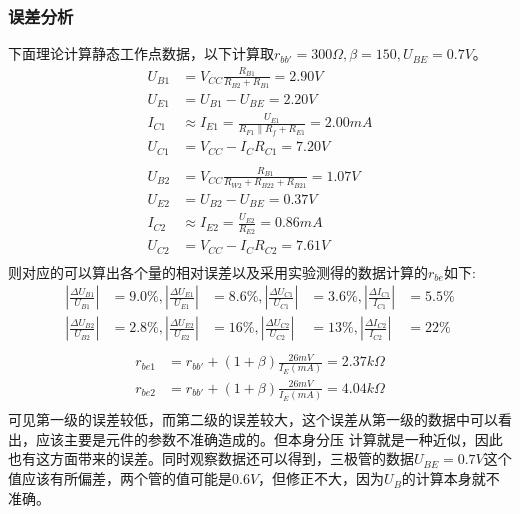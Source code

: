 \documentclass[a4paper,11pt,UTF8]{ctexart}
\begin{document}
  \subsubsection{误差分析}
  下面理论计算静态工作点数据，以下计算取$r_{bb'}=300\Omega,\beta=150,U_{BE}=0.7V$。
  \begin{equation}
    \begin{aligned}
      U_{B1}&=V_{CC}\frac{R_{B1}}{R_{B2}+R_{B1}}=2.90V\\
      U_{E1}&=U_{B1}-U_{BE}=2.20V\\
      I_{C1}&\approx I_{E1}=\frac{U_{E1}}{R_{F1}\parallel R_{f}+R_{E1}}=2.00mA\\
      U_{C1}&=V_{CC}-I_C R_{C1}=7.20V\\
      &\,\\
      U_{B2}&=V_{CC}\frac{R_{B1}}{R_{W2}+R_{B22}+R_{B21}}=1.07V\\
      U_{E2}&=U_{B2}-U_{BE}=0.37V\\
      I_{C2}&\approx I_{E2}=\frac{U_{E2}}{R_{E2}}=0.86mA\\
      U_{C2}&=V_{CC}-I_C R_{C2}=7.61V\\
    \end{aligned}
  \end{equation}
  则对应的可以算出各个量的相对误差以及采用实验测得的数据计算的$r_{be}$如下:
  \begin{equation}
    \begin{aligned}
      \left |\frac{\Delta U_{B1}}{U_{B1}}\right |&=9.0\%,
      \left |\frac{\Delta U_{E1}}{U_{E1}}\right |&=8.6\%,
      \left |\frac{\Delta U_{C1}}{U_{C1}}\right |&=3.6\%,
      \left |\frac{\Delta I_{C1}}{I_{C1}}\right |&=5.5\%\\ 
      \left |\frac{\Delta U_{B2}}{U_{B2}}\right |&=2.8\%,
      \left |\frac{\Delta U_{E2}}{U_{E2}}\right |&=16\%,
      \left |\frac{\Delta U_{C2}}{U_{C2}}\right |&=13\%,
      \left |\frac{\Delta I_{C2}}{I_{C2}}\right |&=22\%\\
    \end{aligned}
  \end{equation}
  \begin{equation}
    \begin{aligned}
      r_{be1}&=r_{bb'}+(1+\beta)\frac{26mV}{I_E(mA)}=2.37k\Omega\\
      r_{be2}&=r_{bb'}+(1+\beta)\frac{26mV}{I_E(mA)}=4.04k\Omega\\
    \end{aligned}
  \end{equation}
  可见第一级的误差较低，而第二级的误差较大，这个误差从第一级的数据中可以看出，应该主要是元件的参数不准确造成的。但本身分压
  计算就是一种近似，因此也有这方面带来的误差。同时观察数据还可以得到，三极管的数据$U_{BE}=0.7V$这个值应该有所偏差，两个管的值可能是$0.6V$，但修正不大，因为$U_B$的计算本身就不准确。
\end{document}
